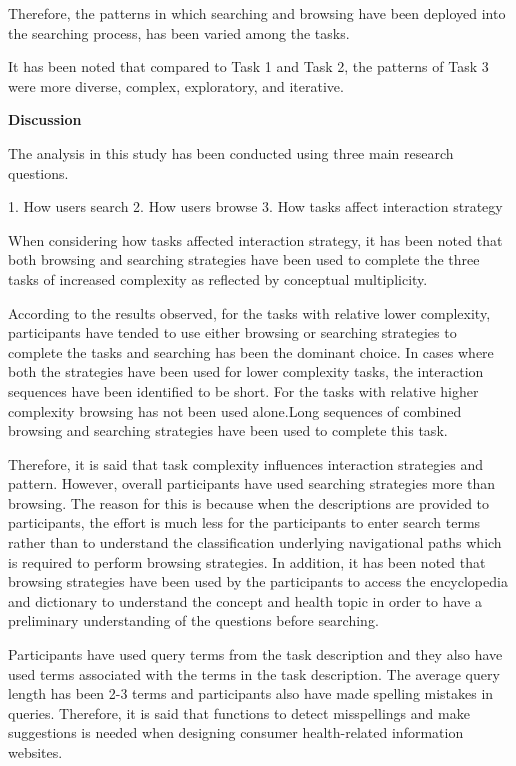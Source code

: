 \documentclass[]{article}
\begin{document}
Therefore, the patterns in which searching and browsing have been deployed into the searching process, has been varied among the tasks. 

It has been noted that compared to Task 1 and Task 2, the patterns of Task 3 were more diverse, complex, exploratory, and iterative.

\textbf{Discussion}

The analysis in this study has been conducted using three main research questions.

1. How users search
2. How users browse
3. How tasks affect interaction strategy 

When considering how tasks affected interaction strategy, it has been noted that both browsing and searching strategies have been used to complete the three tasks of increased complexity as reflected by
conceptual multiplicity. 

According to the results observed, for the tasks with relative lower complexity, participants have tended to use either browsing or searching strategies to complete the tasks and searching has been the dominant choice. In cases where both the strategies have been used for lower complexity tasks, the interaction sequences have been identified to be short. For the tasks with relative higher complexity browsing has not been used alone.Long sequences of combined browsing and searching strategies have been used to complete this task.

Therefore, it is said that task complexity influences interaction strategies and pattern. However, overall participants have used searching strategies more than browsing. The reason for this is because when the descriptions are provided to participants, the effort is much less for the participants to enter search terms rather than to understand the classification underlying navigational paths which is required to perform browsing strategies. In addition, it has been noted that browsing strategies have been used by the participants to access the encyclopedia and dictionary to understand the concept and health topic in order to have a preliminary understanding of the questions before searching. 

Participants have used query terms from the task description and they also have used terms associated with the terms in the task description. The average query length has been 2-3 terms and participants also have made spelling mistakes in queries. Therefore, it is said that functions to detect misspellings and
make suggestions is needed when designing consumer health-related information websites.      
\end{document}
